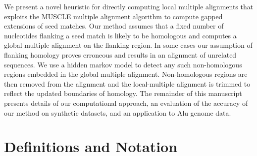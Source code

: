 \documentclass{ws-procs9x6}
\begin{document}
We present a novel heuristic for directly computing local multiple alignments that exploits the MUSCLE multiple alignment algorithm to compute gapped extensions of seed matches.  Our method assumes that a fixed number of nucleotides flanking a seed match is likely to be homologous and computes a global multiple alignment on the flanking region.  In some cases our assumption of flanking homology proves erroneous and results in an alignment of unrelated sequences.  We use a hidden markov model to detect any such non-homologous regions embedded in the global multiple alignment.  Non-homologous regions are then removed from the alignment and the local-multiple alignment is trimmed to reflect the updated boundaries of homology.  The remainder of this manuscript presents details of our computational approach, an evaluation of the accuracy of our method on synthetic datasets, and an application to Alu genome data.



\label{sec:overview}
\section{Definitions and Notation}
\end{document}
